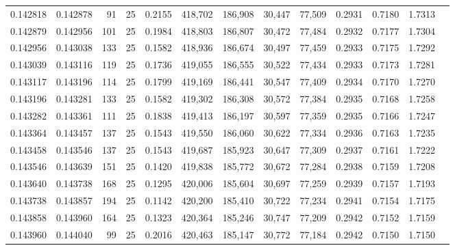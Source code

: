 \begin{tabular}{rrrrrrrrrrrrr}
0.142818 & 0.142878 &    91 &  25 &                                     0.2155 & 418,702 & 186,908 &  30,447 &  77,509 & 0.2931 & 0.7180 & 1.7313 \\
0.142879 & 0.142956 &   101 &  25 &                                     0.1984 & 418,803 & 186,807 &  30,472 &  77,484 & 0.2932 & 0.7177 & 1.7304 \\
0.142956 & 0.143038 &   133 &  25 &                                     0.1582 & 418,936 & 186,674 &  30,497 &  77,459 & 0.2933 & 0.7175 & 1.7292 \\
0.143039 & 0.143116 &   119 &  25 &                                     0.1736 & 419,055 & 186,555 &  30,522 &  77,434 & 0.2933 & 0.7173 & 1.7281 \\
0.143117 & 0.143196 &   114 &  25 &                                     0.1799 & 419,169 & 186,441 &  30,547 &  77,409 & 0.2934 & 0.7170 & 1.7270 \\
0.143196 & 0.143281 &   133 &  25 &                                     0.1582 & 419,302 & 186,308 &  30,572 &  77,384 & 0.2935 & 0.7168 & 1.7258 \\
0.143282 & 0.143361 &   111 &  25 &                                     0.1838 & 419,413 & 186,197 &  30,597 &  77,359 & 0.2935 & 0.7166 & 1.7247 \\
0.143364 & 0.143457 &   137 &  25 &                                     0.1543 & 419,550 & 186,060 &  30,622 &  77,334 & 0.2936 & 0.7163 & 1.7235 \\
0.143458 & 0.143546 &   137 &  25 &                                     0.1543 & 419,687 & 185,923 &  30,647 &  77,309 & 0.2937 & 0.7161 & 1.7222 \\
0.143546 & 0.143639 &   151 &  25 &                                     0.1420 & 419,838 & 185,772 &  30,672 &  77,284 & 0.2938 & 0.7159 & 1.7208 \\
0.143640 & 0.143738 &   168 &  25 &                                     0.1295 & 420,006 & 185,604 &  30,697 &  77,259 & 0.2939 & 0.7157 & 1.7193 \\
0.143738 & 0.143857 &   194 &  25 &                                     0.1142 & 420,200 & 185,410 &  30,722 &  77,234 & 0.2941 & 0.7154 & 1.7175 \\
0.143858 & 0.143960 &   164 &  25 &                                     0.1323 & 420,364 & 185,246 &  30,747 &  77,209 & 0.2942 & 0.7152 & 1.7159 \\
0.143960 & 0.144040 &    99 &  25 &                                     0.2016 & 420,463 & 185,147 &  30,772 &  77,184 & 0.2942 & 0.7150 & 1.7150 \\

\end{tabular}
